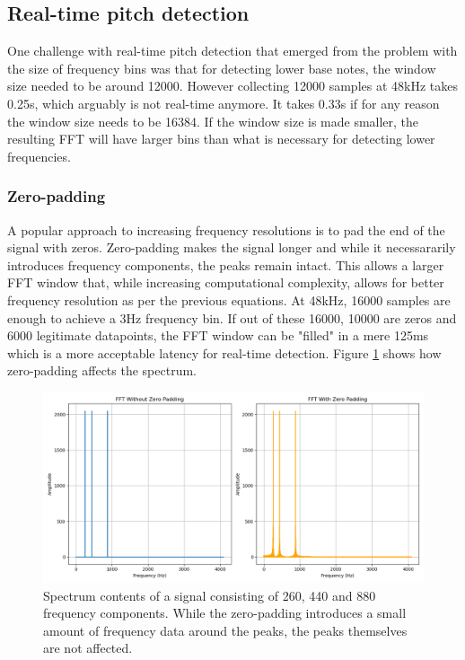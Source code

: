 \subsection{Real-time pitch detection}
One challenge with real-time pitch detection that emerged from the problem with the size of frequency bins was that for detecting lower base notes, the window size needed to be around 12000. However collecting 12000 samples at 48kHz takes 0.25s, which arguably is not real-time anymore. It takes 0.33s if for any reason the window size needs to be 16384. If the window size is made smaller, the resulting FFT will have larger bins than what is necessary for detecting lower frequencies. 
\subsubsection{Zero-padding}
A popular approach to increasing frequency resolutions is to pad the end of the signal with zeros. Zero-padding makes the signal longer and while it necessararily introduces frequency components, the peaks remain intact. This allows a larger FFT window that, while increasing computational complexity, allows for better frequency resolution as per the previous equations. At 48kHz, 16000 samples are enough to achieve a 3Hz frequency bin. If out of these 16000, 10000 are zeros and 6000 legitimate datapoints, the FFT window can be "filled" in a mere 125ms which is a more acceptable latency for real-time detection. Figure \ref{fig:zeropadSpectrum} shows how zero-padding affects the spectrum.

\begin{figure}[ht]
    \centering
    \includegraphics[width=\textwidth]{./images/zero_pad_spectrum.png}
    \caption{Spectrum contents of a signal consisting of 260, 440 and 880 frequency components. While the zero-padding introduces a small amount of frequency data around the peaks, the peaks themselves are not affected. \label{fig:zeropadSpectrum}}
\end{figure}

